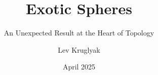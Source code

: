 \documentclass{lkx_thesis}
\title{Exotic Spheres}
\subtitle{An Unexpected Result at the Heart of Topology}
\author{Lev Kruglyak}
\date{April 2025}
\begin{document}


\lkxtoc






\lkxrefs
\lkxindex
\end{document}
